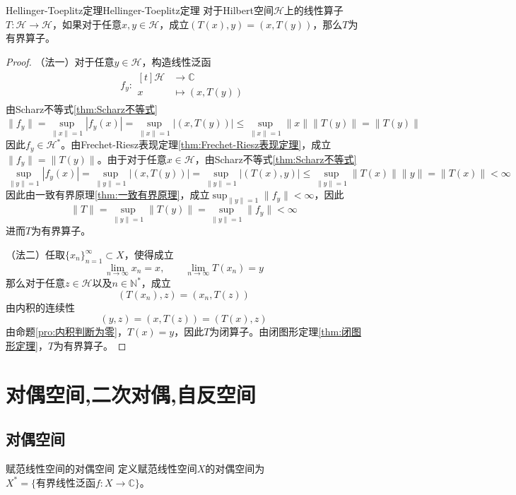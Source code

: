 \documentclass[lang = cn, scheme = chinese, thmcnt = section]{elegantbook}
\newcommand{\N}{\mathbb{N}}            %
\newcommand{\C}{\mathbb{C}}  		   %
\newcommand{\sub}{\subset}             %
\begin{document}
\begin{theorem}{Hellinger-Toeplitz定理}{Hellinger-Toeplitz定理}
	对于Hilbert空间$\mathcal{H}$上的线性算子$T:\mathcal{H}\to\mathcal{H}$，如果对于任意$x,y\in\mathcal{H}$，成立$(T(x),y)=(x,T(y))$，那么$T$为有界算子。
\end{theorem}

\begin{proof}
	（法一）对于任意$y\in\mathcal{H}$，构造线性泛函
	\begin{align*}
		f_y:\begin{aligned}[t]
			\mathcal{H}&\longrightarrow \C\\
			x&\longmapsto (x,T(y))
		\end{aligned}
	\end{align*}
	由Scharz不等式\ref{thm:Scharz不等式}
	$$
	\|f_y\|=\sup_{\|x\|=1}|f_y(x)|=\sup_{\|x\|=1}|(x,T(y))|\le \sup_{\|x\|=1}\|x\|\|T(y)\|=\|T(y)\|
	$$
	因此$f_y\in\mathcal{H}^*$。由Frechet-Riesz表现定理\ref{thm:Frechet-Riesz表现定理}，成立$\|f_y\|=\|T(y)\|$。由于对于任意$x\in\mathcal{H}$，由Scharz不等式\ref{thm:Scharz不等式}
	$$
	\sup_{\|y\|=1}|f_y(x)|
	=\sup_{\|y\|=1}|(x,T(y))|
	=\sup_{\|y\|=1}|(T(x),y)|
	\le\sup_{\|y\|=1}\|T(x)\|\|y\|
	=\|T(x)\|<\infty
	$$
	因此由一致有界原理\ref{thm:一致有界原理}，成立$\displaystyle\sup_{\|y\|=1}\|f_y\|<\infty$，因此
	$$
	\|T\|=\sup_{\|y\|=1}\|T(y)\|=\sup_{\|y\|=1}\|f_y\|<\infty
	$$
	进而$T$为有界算子。
	
	（法二）任取$\{x_n\}_{n=1}^{\infty}\sub X$，使得成立
	$$
	\lim_{n\to\infty}x_n=x,\qquad 
	\lim_{n\to\infty}T(x_n)=y
	$$
	那么对于任意$z\in\mathcal{H}$以及$n\in\N^*$，成立
	$$
	(T(x_n),z)=(x_n,T(z))
	$$
	由内积的连续性
	$$
	(y,z)=(x,T(z))=(T(x),z)
	$$
	由命题\ref{pro:内积判断为零}，$T(x)=y$，因此$T$为闭算子。由闭图形定理\ref{thm:闭图形定理}，$T$为有界算子。
\end{proof}

\section{对偶空间,二次对偶,自反空间}

\subsection{对偶空间}

\begin{definition}{赋范线性空间的对偶空间}
	定义赋范线性空间$X$的对偶空间为$X^*=\{ \text{有界线性泛函}f:X\to \C \}$。
\end{definition}
\end{document}
